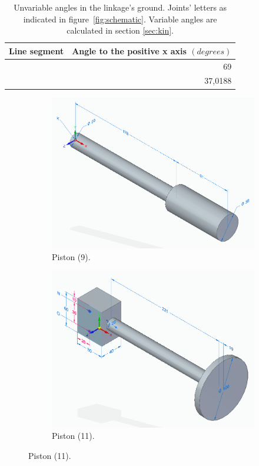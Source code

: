 \documentclass[a4paper]{article}
\begin{document}
\begin{table} 
	\centering
	\begin{tabular}{lr}
		\hline
		Line segment & Angle to the positive x axis \((\si{degrees})\) \\
		\hline
		[AE] & 69 \\
		\text{[AF]} & 37,0188 \\
		\hline
	\end{tabular}
	\caption{Unvariable angles in the linkage's ground. Joints' letters as indicated in figure~\ref{fig:schematic}. Variable angles are calculated in section \ref{sec:kin}.}
	\label{tab:angles}
\end{table}


\begin{figure}[b]
	\centering
	
	\begin{subfigure}[b]{.4\textwidth}
		\centering
		\label{fig:piston9}
		\includegraphics[width=\textwidth]{piston9.png}
		\caption{Piston (9).\centering}
	\end{subfigure}
	\hfill
	\begin{subfigure}[b]{.4\textwidth}
		\centering
		\label{fig:piston11}
		\includegraphics[width=\textwidth]{piston11.png}
		\caption{Piston (11).\centering}
	\end{subfigure}


\end{figure}
\end{document}
